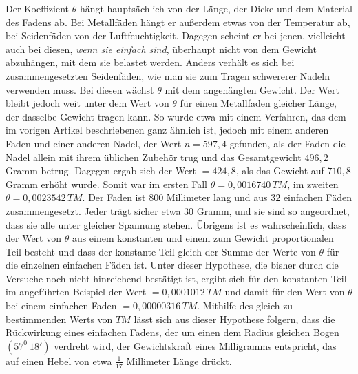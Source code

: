Der Koeffizient $\theta$ hängt hauptsächlich von der Länge, der Dicke und dem Material des Fadens ab. Bei Metallfäden hängt er außerdem etwas von der Temperatur ab, bei Seidenfäden von der Luftfeuchtigkeit. Dagegen scheint er bei jenen, vielleicht auch bei diesen, \textit{wenn sie einfach sind}, überhaupt nicht von dem Gewicht abzuhängen, mit dem sie belastet werden. Anders verhält es sich bei zusammengesetzten Seidenfäden, wie man sie zum Tragen schwererer Nadeln verwenden muss. Bei diesen wächst $\theta$ mit dem angehängten Gewicht. Der Wert bleibt jedoch weit unter dem Wert von $\theta$ für einen Metallfaden gleicher Länge, der dasselbe Gewicht tragen kann. So wurde etwa mit einem Verfahren, das dem im vorigen Artikel beschriebenen ganz ähnlich ist, jedoch mit einem anderen Faden und einer anderen Nadel, der Wert $n=597{,}4$ gefunden, als der Faden die Nadel allein mit ihrem üblichen Zubehör trug und das Gesamtgewicht $496{,}2$ Gramm betrug. Dagegen ergab sich der Wert $=424{,}8$, als das Gewicht auf $710{,}8$ Gramm erhöht wurde. Somit war im ersten Fall $\theta=0{,}0016740\,TM$, im zweiten $\theta=0{,}0023542\,TM$. Der Faden ist $800$ Millimeter lang und aus $32$ einfachen Fäden zusammengesetzt. Jeder trägt sicher etwa $30$ Gramm, und sie sind so angeordnet, dass sie alle unter gleicher Spannung stehen. Übrigens ist es wahrscheinlich, dass der Wert von $\theta$ aus einem konstanten und einem zum Gewicht proportionalen Teil besteht und dass der konstante Teil gleich der Summe der Werte von $\theta$ für die einzelnen einfachen Fäden ist. Unter dieser Hypothese, die bisher durch die Versuche noch nicht hinreichend bestätigt ist, ergibt sich für den konstanten Teil im angeführten Beispiel der Wert $=0{,}0001012\,TM$ und damit für den Wert von $\theta$ bei einem einfachen Faden $=0{,}00000316\,TM$. Mithilfe des gleich zu bestimmenden Werts von $TM$ lässt sich aus dieser Hypothese folgern, dass die Rückwirkung eines einfachen Fadens, der um einen dem Radius gleichen Bogen $(57^0\ 18')$ verdreht wird, der Gewichtskraft eines Milligramms entspricht, das auf einen Hebel von etwa $\frac1{17}$ Millimeter Länge drückt.

